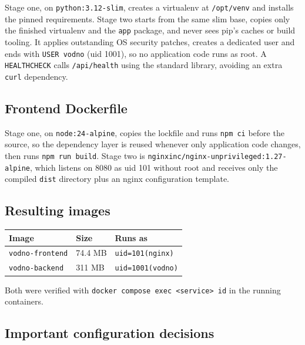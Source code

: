 \documentclass[10pt,a4paper]{article}
\newcommand{\cd}[1]{\texttt{\small #1}}
\begin{document}
Stage one, on \cd{python:3.12-slim}, creates a virtualenv at \cd{/opt/venv}
and installs the pinned requirements. Stage two starts from the same slim base,
copies only the finished virtualenv and the \cd{app} package, and never sees
pip's caches or build tooling. It applies outstanding OS security patches,
creates a dedicated user and ends with \cd{USER vodno} (uid 1001), so no
application code runs as root. A \cd{HEALTHCHECK} calls \cd{/api/health} using
the standard library, avoiding an extra \cd{curl} dependency.

\subsection{Frontend Dockerfile}

Stage one, on \cd{node:24-alpine}, copies the lockfile and runs \cd{npm ci}
before the source, so the dependency layer is reused whenever only application
code changes, then runs \cd{npm run build}. Stage two is
\cd{nginxinc/nginx-unprivileged:1.27-alpine}, which listens on 8080 as uid 101
without root and receives only the compiled \cd{dist} directory plus an nginx
configuration template.

\subsection{Resulting images}

\begin{center}
\begin{tabular}{@{}lll@{}}
\toprule
\textbf{Image} & \textbf{Size} & \textbf{Runs as} \\
\midrule
\cd{vodno-frontend} & 74.4 MB & \cd{uid=101(nginx)} \\
\cd{vodno-backend}  & 311 MB  & \cd{uid=1001(vodno)} \\
\bottomrule
\end{tabular}
\end{center}

Both were verified with \cd{docker compose exec <service> id} in the running
containers.

\subsection{Important configuration decisions}
\end{document}
